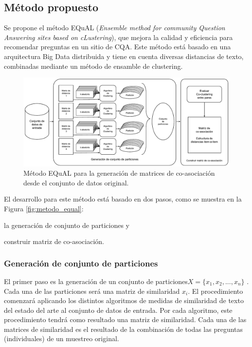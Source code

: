 \subsection{Método propuesto}
Se propone el método EQuAL (\textit{Ensemble method for community Question Answering sites based on cLustering}), que mejora la calidad y eficiencia para recomendar preguntas en un sitio de CQA. Este método está basado en una arquitectura Big Data distribuida y tiene en cuenta diversas distancias de texto, combinadas mediante un método de ensamble de clustering.

\begin{figure}
	\centering
	\includegraphics[width=0.9\linewidth]{8_problema_investigacion/imagenes/metodo_equal}
	\caption{Método EQuAL para la generación de matrices de co-asociación desde el conjunto de datos original.}
	\label{fig:metodoequal}
\end{figure}

\bigskip El desarrollo para este método está basado en dos pasos, como se muestra en la Figura \ref{fig:metodo_equal}: \begin{enumerate*} [label=(\roman*)] \item la generación de conjunto de particiones y \item construir matriz de co-asociación. \end{enumerate*}

\subsubsection{Generación de conjunto de particiones}
El primer paso es la generación de un conjunto de particiones\(X = \{x_1, x_2,... , x_n\}\) . Cada una de las particiones será una matriz de similaridad \(x_i\). El procedimiento comenzará aplicando los distintos algoritmos de medidas de similaridad de texto del estado del arte al conjunto de datos de entrada. Por cada algoritmo, este procedimiento tendrá como resultado una matriz de similaridad. Cada una de las matrices de similaridad es el resultado de la combinación de todas las preguntas (individuales) de un muestreo original.

